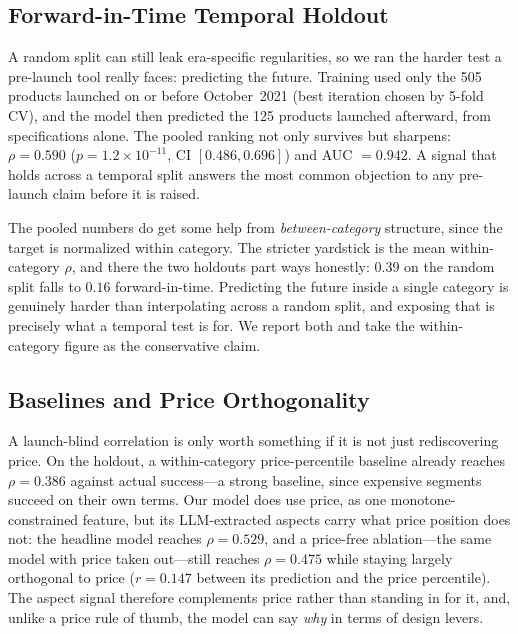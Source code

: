 \documentclass[journal]{IEEEtran}
\begin{document}
\subsection{Forward-in-Time Temporal Holdout}
A random split can still leak era-specific regularities, so we ran the harder test a pre-launch tool really faces: predicting the future. Training used only the 505 products launched on or before October~2021 (best iteration chosen by 5-fold CV), and the model then predicted the 125 products launched afterward, from specifications alone. The pooled ranking not only survives but sharpens: $\rho = 0.590$ ($p = 1.2\times10^{-11}$, CI $[0.486, 0.696]$) and AUC $= 0.942$. A signal that holds across a temporal split answers the most common objection to any pre-launch claim before it is raised.

The pooled numbers do get some help from \emph{between-category} structure, since the target is normalized within category. The stricter yardstick is the mean within-category $\rho$, and there the two holdouts part ways honestly: $0.39$ on the random split falls to $0.16$ forward-in-time. Predicting the future inside a single category is genuinely harder than interpolating across a random split, and exposing that is precisely what a temporal test is for. We report both and take the within-category figure as the conservative claim.

\subsection{Baselines and Price Orthogonality}
A launch-blind correlation is only worth something if it is not just rediscovering price. On the holdout, a within-category price-percentile baseline already reaches $\rho = 0.386$ against actual success---a strong baseline, since expensive segments succeed on their own terms. Our model does use price, as one monotone-constrained feature, but its LLM-extracted aspects carry what price position does not: the headline model reaches $\rho = 0.529$, and a price-free ablation---the same model with price taken out---still reaches $\rho = 0.475$ while staying largely orthogonal to price ($r = 0.147$ between its prediction and the price percentile). The aspect signal therefore complements price rather than standing in for it, and, unlike a price rule of thumb, the model can say \emph{why} in terms of design levers.
\end{document}
